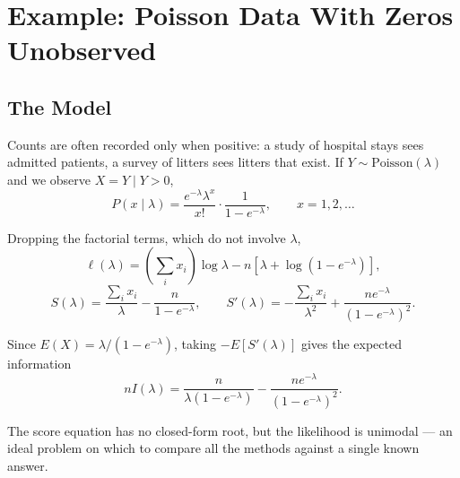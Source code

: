 \documentclass[
  letterpaper,
  DIV=11,
  numbers=noendperiod]{scrreprt}
\begin{document}
\section{Example: Poisson Data With Zeros
Unobserved}\label{example-poisson-data-with-zeros-unobserved}

\subsection{The Model}\label{the-model}

Counts are often recorded only when positive: a study of hospital stays
sees admitted patients, a survey of litters sees litters that exist. If
\(Y \sim \mathrm{Poisson}(\lambda)\) and we observe
\(X = Y \mid Y > 0\),
\[P(x \mid \lambda) = \frac{e^{-\lambda}\lambda^{x}}{x!}\cdot\frac{1}{1 - e^{-\lambda}}, \qquad x = 1, 2, \ldots\]

Dropping the factorial terms, which do not involve \(\lambda\),
\[\ell(\lambda) = \left(\sum_i x_i\right)\log\lambda - n\left[\lambda + \log\left(1 - e^{-\lambda}\right)\right],\]
\[S(\lambda) = \frac{\sum_i x_i}{\lambda} - \frac{n}{1 - e^{-\lambda}}, \qquad
S'(\lambda) = -\frac{\sum_i x_i}{\lambda^{2}} + \frac{n e^{-\lambda}}{\left(1 - e^{-\lambda}\right)^{2}} .\]

Since \(E(X) = \lambda/(1 - e^{-\lambda})\), taking \(-E[S'(\lambda)]\)
gives the expected information
\[n I(\lambda) = \frac{n}{\lambda\left(1 - e^{-\lambda}\right)} - \frac{n e^{-\lambda}}{\left(1 - e^{-\lambda}\right)^{2}} .\]

The score equation has no closed-form root, but the likelihood is
unimodal --- an ideal problem on which to compare all the methods
against a single known answer.
\end{document}
